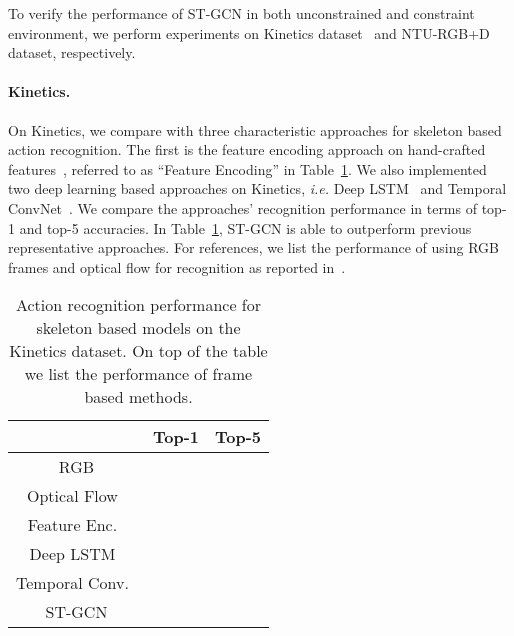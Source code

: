 \documentclass[letterpaper]{article} \usepackage{aaai18}  \usepackage{times}  \usepackage{helvet}  \usepackage{courier}  \usepackage{url}  \usepackage{graphicx}
\begin{document}
To verify the performance of ST-GCN in both unconstrained and constraint environment, we perform experiments on Kinetics dataset~\cite{Kay2017Kinetics} and NTU-RGB+D dataset\cite{Shahroudy2016CVPR}, respectively.

\paragraph{Kinetics.}
On Kinetics, we compare with three characteristic approaches for skeleton based action recognition. The first is the feature encoding approach on hand-crafted features~\cite{Fernando2015VideoDarwin}, referred to as ``Feature Encoding'' in Table~\ref{tab:kinetics}. 
We also implemented two deep learning based approaches on Kinetics, \emph{i.e.} Deep LSTM~\cite{Shahroudy2016CVPR} and Temporal ConvNet~\cite{Kim2017CVPRW}.
We compare the approaches' recognition performance in terms of top-1 and top-5 accuracies.
In Table~\ref{tab:kinetics}, ST-GCN is able to outperform previous representative approaches. 
For references, we list the performance of using RGB frames and optical flow for recognition as reported in~\cite{Kay2017Kinetics}.

\begin{table}
	\centering
	\begin{tabular}{c|c|c}
		\hline
		& Top-1 & Top-5 \\ \hline
		RGB\cite{Kay2017Kinetics}				& 	 &\\
		Optical Flow~\cite{Kay2017Kinetics}	& 	 & \\\hline
		Feature Enc.~\cite{Fernando2015VideoDarwin}	& 	& \\
		Deep LSTM~\cite{Shahroudy2016CVPR}		& 	&  \\
		Temporal Conv.~\cite{Kim2017CVPRW}	& &  \\\hline
		ST-GCN 					&  &  \\\hline
	\end{tabular}
	\caption{Action recognition performance for skeleton based models on the Kinetics dataset.  On top of the table we list the performance of frame based methods. }\label{tab:kinetics}
\end{table}
\end{document}
